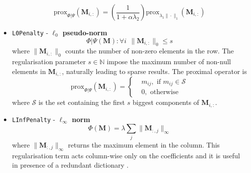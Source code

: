 \begin{itemize}
\begin{equation}\label{proxen}
\text{prox}_{\Phi|\Psi}( \mathbf{M}_{i,:}) = \left(\frac{1}{1 + \alpha\lambda_2}\right) \text{prox}_{\lambda_1 \|\cdot\|_1} ( \mathbf{M}_{i,:})
\end{equation}
%
%
\item \texttt{L0Penalty} - \textbf{$\ell_0$ pseudo-norm}
\begin{equation}\label{l0penalty}
\Phi|\Psi(\mathbf{M}) : \forall i\ \    \|\mathbf{M}_{i,:}\|_0 \leq s
\end{equation}
where $\|\mathbf{M}_{i,:}\|_0$ counts the number of non-zero elements in the row. The regularisation parameter $s\in \mathbb{N}$ impose the maximum number of non-null elements in $\mathbf{M}_{i,:}$, naturally leading to sparse results. The proximal operator is
\begin{equation}
\text{prox}_{\Phi|\Psi}(\textbf{M}_{i,:}) = \begin{cases} &m_{ij}, \text{ if } m_{ij} \in \mathcal{S} \\ &0, \text{ otherwise} \end{cases}
\end{equation}
where $\mathcal{S}$ is the set containing the first $s$ biggest components of $\textbf{M}_{i,:}$.\\
%
%
%
\item \texttt{LInfPenalty} - \textbf{$\ell_\infty$ norm}
\begin{equation}\label{linfpenalty}
\Phi(\mathbf{M}) = \lambda \sum_j \|\mathbf{M}_{:,j}\|_\infty
\end{equation}
where $\|\mathbf{M}_{:,j}\|_\infty$ returns the maximum element in the column.
This regularisation term acts column-wise only on the coefficients and it is useful in presence of a redundant dictionary \cite{tropp2006just}.


\end{itemize}
